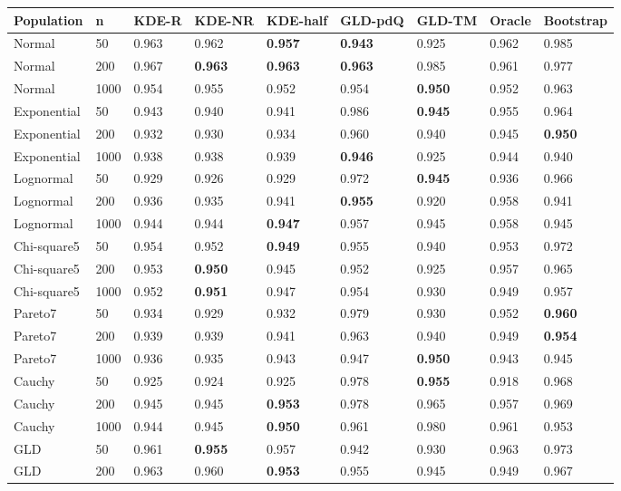 \begin{tabular}{lllllllll}
\toprule
Population & n & KDE-R & KDE-NR & KDE-half & GLD-pdQ & GLD-TM & Oracle & Bootstrap \\
\midrule
Normal & 50 & 0.963 & 0.962 & \textbf{0.957} & \textbf{0.943} & 0.925 & 0.962 & 0.985 \\
Normal & 200 & 0.967 & \textbf{0.963} & \textbf{0.963} & \textbf{0.963} & 0.985 & 0.961 & 0.977 \\
Normal & 1000 & 0.954 & 0.955 & 0.952 & 0.954 & \textbf{0.950} & 0.952 & 0.963 \\
Exponential & 50 & 0.943 & 0.940 & 0.941 & 0.986 & \textbf{0.945} & 0.955 & 0.964 \\
Exponential & 200 & 0.932 & 0.930 & 0.934 & 0.960 & 0.940 & 0.945 & \textbf{0.950} \\
Exponential & 1000 & 0.938 & 0.938 & 0.939 & \textbf{0.946} & 0.925 & 0.944 & 0.940 \\
Lognormal & 50 & 0.929 & 0.926 & 0.929 & 0.972 & \textbf{0.945} & 0.936 & 0.966 \\
Lognormal & 200 & 0.936 & 0.935 & 0.941 & \textbf{0.955} & 0.920 & 0.958 & 0.941 \\
Lognormal & 1000 & 0.944 & 0.944 & \textbf{0.947} & 0.957 & 0.945 & 0.958 & 0.945 \\
Chi-square5 & 50 & 0.954 & 0.952 & \textbf{0.949} & 0.955 & 0.940 & 0.953 & 0.972 \\
Chi-square5 & 200 & 0.953 & \textbf{0.950} & 0.945 & 0.952 & 0.925 & 0.957 & 0.965 \\
Chi-square5 & 1000 & 0.952 & \textbf{0.951} & 0.947 & 0.954 & 0.930 & 0.949 & 0.957 \\
Pareto7 & 50 & 0.934 & 0.929 & 0.932 & 0.979 & 0.930 & 0.952 & \textbf{0.960} \\
Pareto7 & 200 & 0.939 & 0.939 & 0.941 & 0.963 & 0.940 & 0.949 & \textbf{0.954} \\
Pareto7 & 1000 & 0.936 & 0.935 & 0.943 & 0.947 & \textbf{0.950} & 0.943 & 0.945 \\
Cauchy & 50 & 0.925 & 0.924 & 0.925 & 0.978 & \textbf{0.955} & 0.918 & 0.968 \\
Cauchy & 200 & 0.945 & 0.945 & \textbf{0.953} & 0.978 & 0.965 & 0.957 & 0.969 \\
Cauchy & 1000 & 0.944 & 0.945 & \textbf{0.950} & 0.961 & 0.980 & 0.961 & 0.953 \\
GLD & 50 & 0.961 & \textbf{0.955} & 0.957 & 0.942 & 0.930 & 0.963 & 0.973 \\
GLD & 200 & 0.963 & 0.960 & \textbf{0.953} & 0.955 & 0.945 & 0.949 & 0.967 \\

\end{tabular}
